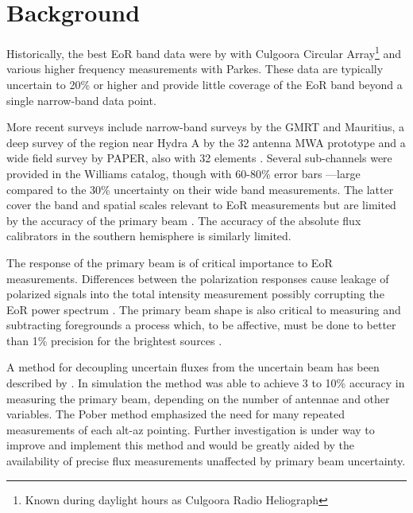 \documentclass[preprint]{aastex}
\begin{document}

\section{Background}


Historically, the best
EoR band data were by \citet{Slee:1995p7541} with Culgoora Circular
Array\footnote{Known during daylight hours as Culgoora Radio Heliograph} and
various higher frequency measurements with Parkes.  These data are typically
uncertain to 20\% or higher and provide little coverage of the EoR band beyond
a single narrow-band data point. 

More recent surveys include narrow-band surveys by the GMRT and Mauritius, a
deep survey of the region near Hydra A by the 32 antenna MWA prototype
\cite{Williams:2012p8768} and a wide field survey by PAPER, also with 32
elements \cite{Jacobs:2011p8438}. Several sub-channels were provided in the
Williams catalog, though with 60-80\% error bars ---large compared to the 30\%
uncertainty on their wide band measurements.  The latter cover the band and
spatial scales relevant to EoR measurements but are limited by the accuracy of
the primary beam \citep{Jacobs:2013p9713}. The accuracy of the absolute flux calibrators in the southern hemisphere
is similarly limited.  


The response of the primary beam is of critical importance to EoR measurements.
Differences between the polarization responses cause leakage of polarized
signals into the total intensity measurement possibly corrupting the 
EoR power spectrum \cite{Moore:2013p9621}.  The primary beam 
shape is also critical to measuring and subtracting foregrounds 
\cite{Bernardi:2012p9020} a process which, to be affective, must be done to better than 1\%
precision for the brightest sources \citet{Liu:2009p4762,Bowman:2009p7816} .

A method for decoupling uncertain fluxes from the uncertain beam has been
described by \citet{Pober:2012p8800}. In simulation the method was able to
achieve 3 to 10\% accuracy in measuring the primary beam, depending on the
number of antennae and other variables. The Pober method emphasized the need
for many repeated measurements of each alt-az pointing. Further investigation
is under way to improve and implement this method and would be greatly aided by
the availability of precise flux measurements unaffected by primary beam
uncertainty. 
\end{document}
